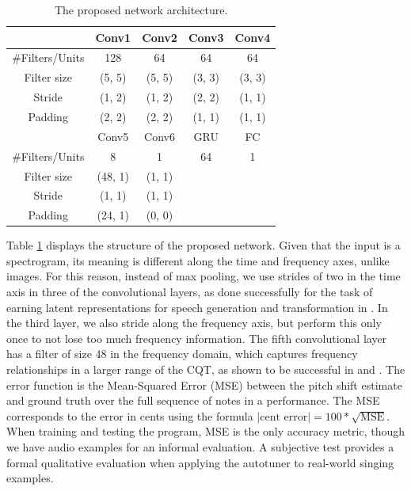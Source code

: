 \begin{table}[t]
  \begin{center}
    \caption{The proposed network architecture.}
    \begin{tabular}{|c||c|c|c|c|}
    \hline
      & Conv1 & Conv2 & Conv3 & Conv4 \\
      \hline
      \#Filters/Units & 128 & 64 & 64 & 64 \\
      Filter size & (5, 5) & (5, 5) & (3, 3) & (3, 3) \\
      Stride & (1, 2) & (1, 2) & (2, 2) & (1, 1) \\
      Padding & (2, 2) & (2, 2) & (1, 1) & (1, 1) \\
      \hline
      & Conv5 & Conv6 & GRU & FC \\
      \hline
      \#Filters/Units & 8 & 1 & 64 & 1 \\
      Filter size & (48, 1) & (1, 1) & & \\
      Stride & (1, 1) & (1, 1) & & \\
      Padding & (24, 1) & (0, 0) & & \\
      \hline
    \end{tabular}
    \vspace{-.1in}
    \label{tab:network}
  \end{center}
\end{table}

Table \ref{tab:network} displays the structure of the proposed network. Given that the input is a spectrogram, its meaning is different along the time and frequency axes, unlike images. For this reason, instead of max pooling, we use strides of two in the time axis in three of the convolutional layers, as done successfully for the task of earning latent representations for speech generation and transformation in \cite{hsu2017learning}. In the third layer, we also stride along the frequency axis, but perform this only once to not lose too much frequency information. The fifth convolutional layer has a filter of size 48 in the frequency domain, which captures frequency relationships in a larger range of the CQT, as shown to be successful in \cite{bittner2017deep} and \cite{hsu2017learning}. 
The error function is the Mean-Squared Error (MSE) between the pitch shift estimate and ground truth over the full sequence of notes in a performance. The MSE corresponds to the error in cents using the formula $\left|\text{cent error}\right| = 100 * \sqrt{\text{MSE}}$. When training and testing the program, MSE is the only accuracy metric, though we have audio examples for an informal evaluation. A subjective test provides a formal qualitative evaluation when applying the autotuner to real-world singing examples.

